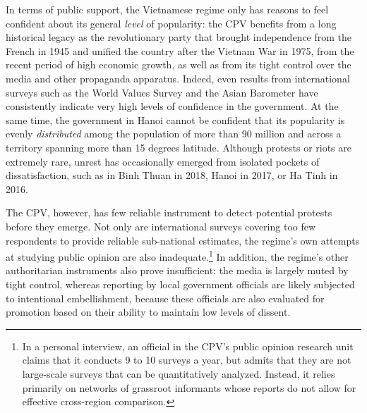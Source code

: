 \documentclass[12pt]{article}
\newcommand{\1}{\mathbbm{1}}
\begin{document}
In terms of public support, the Vietnamese regime only has reasons to feel confident about its general \textit{level} of popularity: the CPV benefits from a long historical legacy as the revolutionary party that brought independence from the French in 1945 and unified the country after the Vietnam War in 1975, from the recent period of high economic growth, as well as from its tight control over the media and other propaganda apparatus. Indeed, even results from international surveys such as the World Values Survey \citeyearpar{wvs} and the Asian Barometer \citeyearpar{abs} have consistently indicate very high levels of confidence in the government. At the same time, the government in Hanoi cannot be confident that its popularity is evenly \textit{distributed} among the population of more than 90 million and across a territory spanning more than 15 degrees latitude. Although protests or riots are extremely rare, unrest has occasionally emerged from isolated pockets of dissatisfaction, such as in Binh Thuan in 2018, Hanoi in 2017, or Ha Tinh in 2016. 

The CPV, however, has few reliable instrument to detect potential protests before they emerge. Not only are international surveys covering too few respondents to provide reliable sub-national estimates, the regime's own attempts at studying public opinion are also inadequate.\footnote{In a personal interview, an official in the CPV's public opinion research unit claims that it conducts 9 to 10 surveys a year, but admits that they are not large-scale surveys that can be quantitatively analyzed. Instead, it relies primarily on networks of grassroot informants whose reports do not allow for effective cross-region comparison.} In addition, the regime's other authoritarian instruments also prove insufficient: the media is largely muted by tight control, whereas reporting by local government officials are likely subjected to intentional embellishment, because these officials are also evaluated for promotion based on their ability to maintain low levels of dissent.
\end{document}
